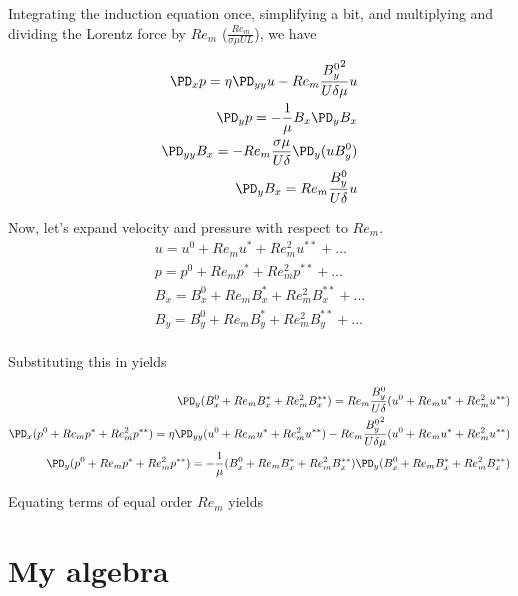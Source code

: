 \documentclass[11pt]{article}
\begin{document}
Integrating the induction equation once, simplifying a bit, and multiplying and dividing
the Lorentz force by $Re_m$ ($\frac{Re_m}{\sigma \mu U L}$), we have

\begin{equation}\begin{aligned}
\PD_x p = \eta \PD_{yy} u - Re_m \frac{{B_y^0}^2}{U \delta \mu} u \\
\PD_y p = - \frac{1}{\mu} B_x \PD_y B_x \\
\PD_{yy} B_x = - Re_m \frac{\sigma \mu}{U \delta} \PD_y (u B_y^0) \\
\PD_{y} B_x = Re_m \frac{B_y^0}{U \delta} u \\
\end{aligned} \end{equation}

Now, let's expand velocity and pressure with respect to $Re_m$.
\begin{equation}\begin{aligned}
	u = u^0 + Re_m u^* + Re_m^2 u^{**} + \hdots \\
	p = p^0 + Re_m p^* + Re_m^2 p^{**} + \hdots \\
	B_x = B_x^0 + Re_m B_x^* + Re_m^2 B_x^{**} + \hdots \\
	B_y = B_y^0 + Re_m B_y^* + Re_m^2 B_y^{**} + \hdots \\
\end{aligned} \end{equation}

Substituting this in yields

\begin{equation}\begin{aligned}
\PD_{y} (B_x^0 + Re_m B_x^* + Re_m^2 B_x^{**}) = Re_m \frac{B_y^0}{U \delta} (u^0 + Re_m u^* + Re_m^2 u^{**}) \\
\PD_x (p^0 + Re_m p^* + Re_m^2 p^{**}) = \eta \PD_{yy} (u^0 + Re_m u^* + Re_m^2 u^{**}) - Re_m \frac{{B_y^0}^2}{U \delta \mu} (u^0 + Re_m u^* + Re_m^2 u^{**}) \\
\PD_y (p^0 + Re_m p^* + Re_m^2 p^{**}) = - \frac{1}{\mu} (B_x^0 + Re_m B_x^* + Re_m^2 B_x^{**}) \PD_y (B_x^0 + Re_m B_x^* + Re_m^2 B_x^{**}) \\
\end{aligned} \end{equation}

Equating terms of equal order $Re_m$ yields

\section{My algebra}
\end{document}
